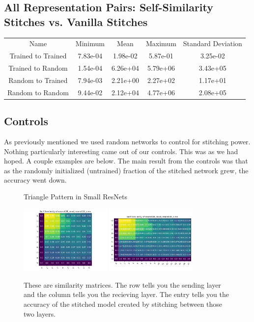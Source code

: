\documentclass{article} %
\begin{document}
\subsection*{All Representation Pairs: Self-Similarity Stitches vs. Vanilla Stitches}
\begin{tabular}{c c c c c}
   Name&Minimum&Mean&Maximum&Standard Deviation\\
   Trained to Trained&7.83e-04&1.98e-02&5.87e-01&3.25e-02\\
   Trained to Random&1.54e-04&6.26e+04&5.79e+06&3.43e+05\\
   Random to Trained&7.94e-03&2.21e+00&2.27e+02&1.17e+01\\
   Random to Random&9.44e-02&2.12e+04&4.77e+06&2.08e+05\\
\end{tabular}
   

\subsection*{Controls}
As previously mentioned we used random networks to control for stitching power. Nothing particularly interesting
came out of our controls. This was as we had hoped. A couple examples are below. The main result from the controls
was that as the randomly initialized (untrained) fraction of the stitched network grew, the accuracy went down.

\begin{center}
   \begin{figure}[h!]
      \centering
      \caption{Triangle Pattern in Small ResNets}
      \includegraphics[width=4.5cm]{resnet18_rand_resnet18_sims.png}
      \includegraphics[width=4.5cm]{resnet18_rand_resnet34_sims.png}
      \caption*{These are similarity matrices. The row tells you the sending layer and the column tells you the recieving layer.
      The entry tells you the accuracy of the stitched model created by stitching between those two layers.}
   \end{figure}
\end{center}
\end{document}
